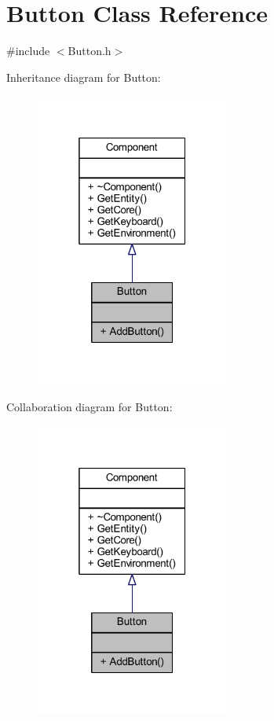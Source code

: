 \hypertarget{class_button}{}\section{Button Class Reference}
\label{class_button}


{\ttfamily \#include $<$Button.\+h$>$}



Inheritance diagram for Button\+:
\nopagebreak
\begin{figure}[H]
\begin{center}
\leavevmode
\includegraphics[width=181pt]{class_button__inherit__graph}
\end{center}
\end{figure}


Collaboration diagram for Button\+:
\nopagebreak
\begin{figure}[H]
\begin{center}
\leavevmode
\includegraphics[width=181pt]{class_button__coll__graph}
\end{center}
\end{figure}
